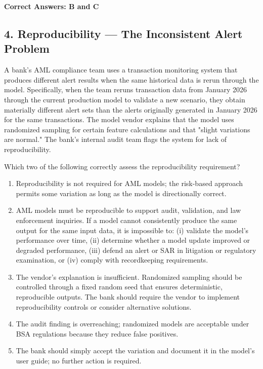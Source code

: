 \documentclass[11pt,a4paper]{article}
\begin{document}
	\textbf{Correct Answers: B and C}
	
	\subsection{4. Reproducibility — The Inconsistent Alert Problem}
	
	A bank's AML compliance team uses a transaction monitoring system that produces different alert results when the same historical data is rerun through the model. Specifically, when the team reruns transaction data from January 2026 through the current production model to validate a new scenario, they obtain materially different alert sets than the alerts originally generated in January 2026 for the same transactions. The model vendor explains that the model uses randomized sampling for certain feature calculations and that "slight variations are normal." The bank's internal audit team flags the system for lack of reproducibility.
	
	Which two of the following correctly assess the reproducibility requirement?
	
	\begin{enumerate}[label=\Alph*.]
		\item Reproducibility is not required for AML models; the risk-based approach permits some variation as long as the model is directionally correct.
		\item AML models must be reproducible to support audit, validation, and law enforcement inquiries. If a model cannot consistently produce the same output for the same input data, it is impossible to: (i) validate the model's performance over time, (ii) determine whether a model update improved or degraded performance, (iii) defend an alert or SAR in litigation or regulatory examination, or (iv) comply with recordkeeping requirements.
		\item The vendor's explanation is insufficient. Randomized sampling should be controlled through a fixed random seed that ensures deterministic, reproducible outputs. The bank should require the vendor to implement reproducibility controls or consider alternative solutions.
		\item The audit finding is overreaching; randomized models are acceptable under BSA regulations because they reduce false positives.
		\item The bank should simply accept the variation and document it in the model's user guide; no further action is required.
	\end{enumerate}
	
\end{document}
